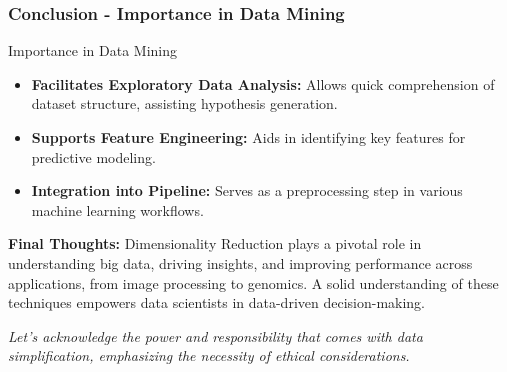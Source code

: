 \documentclass[aspectratio=169]{beamer}
\begin{document}
\begin{frame}[fragile]
    \frametitle{Conclusion - Importance in Data Mining}

    \begin{block}{Importance in Data Mining}
        \begin{itemize}
            \item \textbf{Facilitates Exploratory Data Analysis:} 
                Allows quick comprehension of dataset structure, assisting hypothesis generation.
            \item \textbf{Supports Feature Engineering:} 
                Aids in identifying key features for predictive modeling.
            \item \textbf{Integration into Pipeline:} 
                Serves as a preprocessing step in various machine learning workflows.
        \end{itemize}
    \end{block}

    \textbf{Final Thoughts:}
    Dimensionality Reduction plays a pivotal role in understanding big data, driving insights, and improving performance across applications, from image processing to genomics. A solid understanding of these techniques empowers data scientists in data-driven decision-making.

    \textit{Let's acknowledge the power and responsibility that comes with data simplification, emphasizing the necessity of ethical considerations.}
\end{frame}
\end{document}

